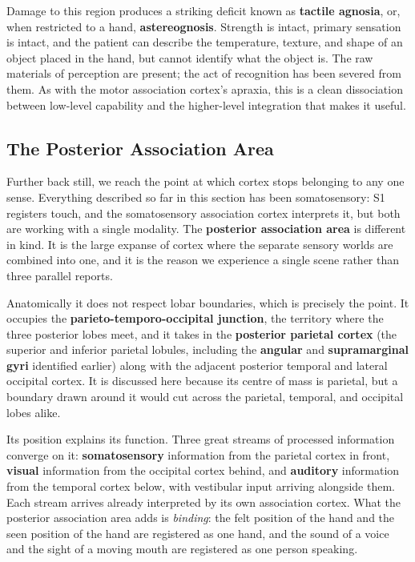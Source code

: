 \documentclass[11pt]{article}
\begin{document}
Damage to this region produces a striking deficit known as \textbf{tactile agnosia}, or, when restricted to a hand, \textbf{astereognosis}. Strength is intact, primary sensation is intact, and the patient can describe the temperature, texture, and shape of an object placed in the hand, but cannot identify what the object is. The raw materials of perception are present; the act of recognition has been severed from them. As with the motor association cortex's apraxia, this is a clean dissociation between low-level capability and the higher-level integration that makes it useful.

\subsection{The Posterior Association Area}

Further back still, we reach the point at which cortex stops belonging to any one sense. Everything described so far in this section has been somatosensory: S1 registers touch, and the somatosensory association cortex interprets it, but both are working with a single modality. The \textbf{posterior association area} is different in kind. It is the large expanse of cortex where the separate sensory worlds are combined into one, and it is the reason we experience a single scene rather than three parallel reports.

Anatomically it does not respect lobar boundaries, which is precisely the point. It occupies the \textbf{parieto-temporo-occipital junction}, the territory where the three posterior lobes meet, and it takes in the \textbf{posterior parietal cortex} (the superior and inferior parietal lobules, including the \textbf{angular} and \textbf{supramarginal gyri} identified earlier) along with the adjacent posterior temporal and lateral occipital cortex. It is discussed here because its centre of mass is parietal, but a boundary drawn around it would cut across the parietal, temporal, and occipital lobes alike.

Its position explains its function. Three great streams of processed information converge on it: \textbf{somatosensory} information from the parietal cortex in front, \textbf{visual} information from the occipital cortex behind, and \textbf{auditory} information from the temporal cortex below, with vestibular input arriving alongside them. Each stream arrives already interpreted by its own association cortex. What the posterior association area adds is \textit{binding}: the felt position of the hand and the seen position of the hand are registered as one hand, and the sound of a voice and the sight of a moving mouth are registered as one person speaking.
\end{document}

